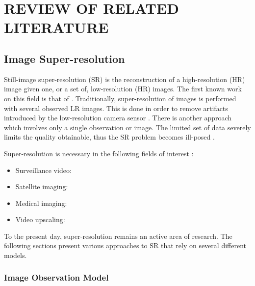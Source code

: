 
\chapter{REVIEW OF RELATED LITERATURE} %

\label{Chapter2} %



\section{Image Super-resolution}

Still-image super-resolution (SR) is the reconstruction of a high-resolution (HR) image given one, or a set of, low-resolution (HR) images. 
The first known work on this field is that of \cite{tsai1984multiframe}. 
Traditionally, super-resolution of images is performed with several observed LR images. This is done in order to remove artifacts introduced by the low-resolution camera sensor \citep{Yang2010a}. 
There is another approach which involves only a single observation or image.
The limited set of data severely limits the quality obtainable, thus 
the SR problem becomes ill-posed \citep{Yang2010a}.

Super-resolution is necessary in the following fields of interest \citep{Yang2010a}:
\begin{itemize}
	\item Surveillance video: 
	\item Satellite imaging:
	\item Medical imaging:
	\item Video upscaling:	
\end{itemize}

To the present day, super-resolution remains an active area of research. 
The following sections present various approaches to SR that rely on several different models.

\subsection{Image Observation Model}

